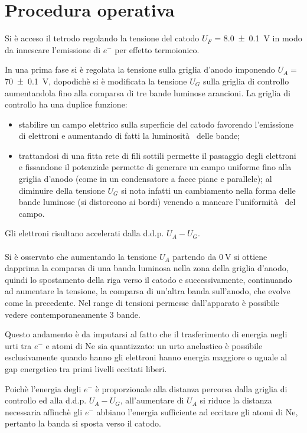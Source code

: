 \section{Procedura operativa}

	Si è acceso il tetrodo regolando la tensione del catodo $U_F$ = \SI{8.0 \pm 0.1}{\volt}
	in modo da innescare l'emissione di $e^{-}$ per effetto termoionico.

	In una prima fase si è regolata la tensione sulla griglia d'anodo imponendo $U_A=$ \SI{70 \pm 0.1}{\volt},	dopodichè si è modificata la tensione $U_G$ sulla griglia di controllo aumentandola fino alla comparsa di tre bande luminose arancioni.
	La griglia di controllo ha una duplice funzione:
	\begin{itemize}
	\item  stabilire un campo elettrico sulla superficie del catodo favorendo l'emissione di elettroni e aumentando di fatti la luminosità  delle bande;
	\item trattandosi di una fitta rete di fili sottili permette il passaggio degli elettroni e fissandone il potenziale permette di generare un campo uniforme fino alla griglia d'anodo (come in un condensatore a facce piane e parallele); al diminuire della tensione $U_G$ si nota infatti un cambiamento nella forma delle bande luminose (si distorcono ai bordi) venendo a mancare l'uniformità  del campo.
	\end{itemize}

	Gli elettroni risultano accelerati dalla d.d.p. $U_A-U_G$.

\paragraph{}
	Si è osservato che aumentando la tensione $U_A$ partendo da $\SI{0}{\volt}$ si ottiene
	dapprima la comparsa di una banda luminosa nella zona della griglia d'anodo, quindi lo spostamento della riga verso il catodo e successivamente, continuando ad aumentare  la tensione, la comparsa di un'altra banda sull'anodo, che evolve come la precedente.
	 Nel range di tensioni permesse dall'apparato è possibile vedere contemporaneamente 3 bande.

		Questo andamento è da imputarsi al fatto che il trasferimento
		di energia negli urti tra $e^{-}$ e atomi di Ne sia
		quantizzato: un urto anelastico è possibile esclusivamente quando hanno gli elettroni hanno energia maggiore o uguale
		al gap energetico tra primi livelli eccitati liberi.

		Poichè l'energia degli $e^{-}$ è proporzionale alla distanza
		percorsa dalla griglia di controllo ed alla d.d.p. $U_A-U_G$,
		all'aumentare di $U_A$ si riduce
		la distanza necessaria affinchè gli $e^-$ abbiano l'energia sufficiente
		ad eccitare gli atomi di Ne, pertanto la banda si sposta verso il catodo.

